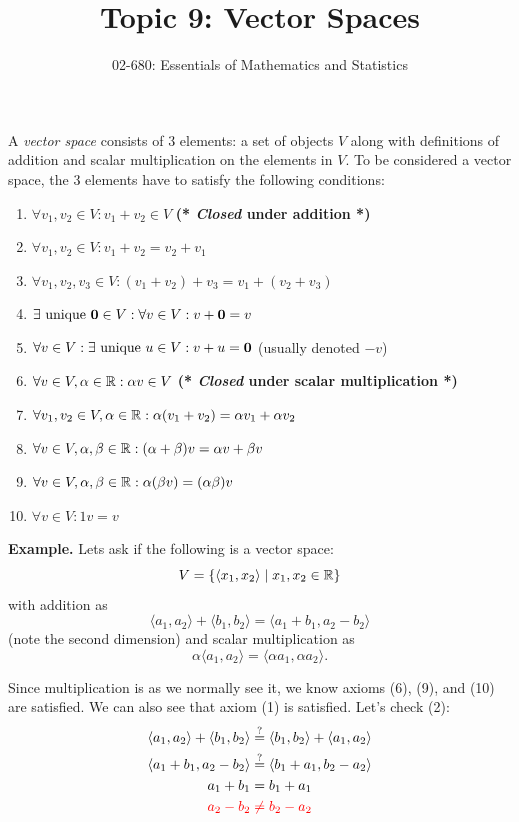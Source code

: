 


\title{Topic 9: Vector Spaces}
\author{02-680: Essentials of Mathematics and Statistics}


\maketitle

A \emph{vector space} consists of 3 elements: 
a set of objects $V$ along with definitions of addition and scalar multiplication on the elements in $V$. 
To be considered a vector space, the 3 elements have to satisfy the following conditions: 
\begin{enumerate}
\item $\forall v_1,v_2 \in V : v_1+v_2 \in V$ \textbf{(* \emph{Closed} under addition *)}
\item $\forall v_1,v_2 \in V : v_1 + v_2 = v_2 + v_1$
\item $\forall v_1,v_2,v_3 \in V : (v_1 + v_2) + v_3 = v_1 + (v_2 + v_3)$
\item $\exists \textnormal{ unique }\mathbf{0} \in V : \forall v \in V : v + \mathbf{0} = v$ 
\item $\forall v \in V : \exists \textnormal{ unique }u \in V : v + u = \mathbf{0}$ (usually denoted $-v$)
\item $\forall v\in V, \alpha \in \operatorname{\mathbb{R}}: \alpha v \in V$ \textbf{(* \emph{Closed} under scalar multiplication *)}
\item $\forall v_1,v_2\in V, \alpha \in \operatorname{\mathbb{R}}: \alpha (v_1 + v_2) = \alpha v_1 + \alpha v_2$
\item $\forall v \in V, \alpha,\beta \in \operatorname{\mathbb{R}}: (\alpha+\beta) v = \alpha v + \beta v$
\item $\forall v \in V, \alpha,\beta \in \operatorname{\mathbb{R}}: \alpha(\beta v) = (\alpha\beta) v$
\item$\forall v \in V : 1v = v$ 
\end{enumerate} 

\vspace{1em}
\textbf{Example.} 
Lets ask if the following is a vector space: 
\[V = \left\{\left\langle x_1, x_2\right\rangle \mid x_1,x_2 \in \operatorname{\mathbb{R}} \right\}\]
with addition as 
\[ \langle a_1,a_2\rangle + \langle b_1, b_2\rangle = \langle a_1+b_1, a_2-b_2\rangle\]
(note the second dimension)
and scalar multiplication as 
\[\alpha \langle a_1,a_2\rangle = \langle \alpha a_1, \alpha a_2\rangle.\]

Since multiplication is as we normally see it, we know axioms (6), 
(9), and (10) are satisfied. 
We can also see that axiom (1) is satisfied.
Let's check (2): 
\[\begin{aligned}
\langle a_1,a_2\rangle + \langle b_1, b_2\rangle & \stackrel{?}{=}  \langle b_1, b_2\rangle + \langle a_1,a_2\rangle\\
\langle a_1+b_1, a_2-b_2\rangle & \stackrel{?}{=}  \langle b_1+a_1, b_2-a_2\rangle\\
a_1+b_1 & =  b_1+a_1\\
\color{red} a_2-b_2& \color{red}\ne  b_2-a_2\\
\end{aligned}\]

